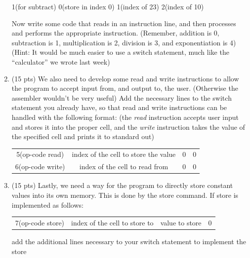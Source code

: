 \documentclass[letterpaper,12pt]{article}
\begin{document}
\begin{enumerate}
                   1(for subtract) 0(store in index 0) 1(index of 23) 2(index of 10)

                   Now write some code that reads in an instruction line, and then processes and performs
                   the appropriate instruction. (Remember, addition is 0, subtraction is 1,
                   multiplication is 2, division is 3, and exponentiation is 4)
                   (Hint: It would be much easier to use a switch statement, much like the “calculator”
                   we wrote last week)
    \item (15 pts) We also need to develop some read and write instructions to allow the program to
                   accept input from, and output to, the user. (Otherwise the assembler wouldn't be
                   very useful) Add the necessary lines to the switch statement you already have,
                   so that read and write instructions can be handled with the following format:
                   (the \emph{read} instruction accepts user input and stores it into the proper cell,
                   and the \emph{write} instruction takes the value of the specified cell and prints it
                   to standard out)
    \begin{table}[H]
    \begin{center}
        \begin{tabular}{c|c|c|c}
            5(op-code read) & index of the cell to store the value & 0 & 0 \\
            6(op-code write) & index of the cell to read from & 0 & 0 \\
        \end{tabular}
    \end{center}
    \end{table}
    \item (15 pts) Lastly, we need a way for the program to directly store constant values into its own
                   memory. This is done by the store command. If store is implemented as follows:
    \begin{table}[H]
    \begin{center}
        \begin{tabular}{c|c|c|c}
            7(op-code store) & index of the cell to store to & value to store & 0 \\
        \end{tabular}
    \end{center}
    \end{table}
                   add the additional lines necessary to your switch statement to implement the store

\end{enumerate}
\end{document}
